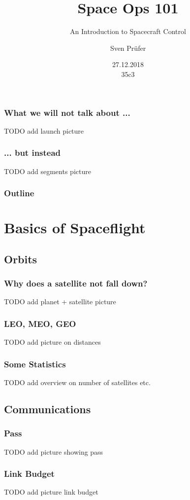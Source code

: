 \documentclass[12pt,utf8,notheorems,compress]{beamer}
\title{Space Ops 101}
\subtitle{An Introduction to Spacecraft Control}
\author{Sven Prüfer}
\institute{German Space Operations Center}
\date{27.12.2018\\[0.5cm]
35c3}
\begin{document}
\begin{frame}
 \titlepage
\end{frame}

\begin{frame}
  \frametitle{What we will not talk about ...}
  TODO add launch picture
\end{frame}

\begin{frame}
  \frametitle{... but instead}
  TODO add segments picture
\end{frame}

\begin{frame}
  \frametitle{Outline}
  \vspace{1cm}
  \tableofcontents
\end{frame}

\section{Basics of Spaceflight}

\subsection{Orbits}

\begin{frame}
  \frametitle{Why does a satellite not fall down?}
  \pause
  TODO add planet + satellite picture
\end{frame}

\begin{frame}
  \frametitle{LEO, MEO, GEO}
  \pause
  TODO add picture on distances
\end{frame}

\begin{frame}
  \frametitle{Some Statistics}
  \pause
  TODO add overview on number of satellites etc.
\end{frame}

\subsection{Communications}

\begin{frame}
  \frametitle{Pass}
  \pause
  TODO add picture showing pass
\end{frame}

\begin{frame}
  \frametitle{Link Budget}
  \pause
  TODO add picture link budget
\end{frame}
\end{document}
